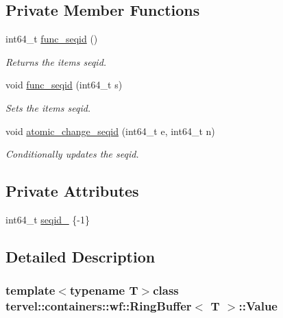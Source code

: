 \subsection*{Private Member Functions}
\begin{DoxyCompactItemize}
\item 
int64\+\_\+t \hyperlink{classtervel_1_1containers_1_1wf_1_1_ring_buffer_1_1_value_addbad0a38025643a16f01edaf501a982}{func\+\_\+seqid} ()
\begin{DoxyCompactList}\small\item\em Returns the items seqid. \end{DoxyCompactList}\item 
void \hyperlink{classtervel_1_1containers_1_1wf_1_1_ring_buffer_1_1_value_a1ea5c365921ff3476b5dba84ad104cbc}{func\+\_\+seqid} (int64\+\_\+t s)
\begin{DoxyCompactList}\small\item\em Sets the items seqid. \end{DoxyCompactList}\item 
void \hyperlink{classtervel_1_1containers_1_1wf_1_1_ring_buffer_1_1_value_a7bd2fbc2b8577ac6bd884e06328bfb2d}{atomic\+\_\+change\+\_\+seqid} (int64\+\_\+t e, int64\+\_\+t n)
\begin{DoxyCompactList}\small\item\em Conditionally updates the seqid. \end{DoxyCompactList}\end{DoxyCompactItemize}
\subsection*{Private Attributes}
\begin{DoxyCompactItemize}
\item 
int64\+\_\+t \hyperlink{classtervel_1_1containers_1_1wf_1_1_ring_buffer_1_1_value_aaecdcc3fbb8c5a8b784625e835c7d6ef}{seqid\+\_\+} \{-\/1\}
\end{DoxyCompactItemize}


\subsection{Detailed Description}
\subsubsection*{template$<$typename T$>$class tervel\+::containers\+::wf\+::\+Ring\+Buffer$<$ T $>$\+::\+Value}

